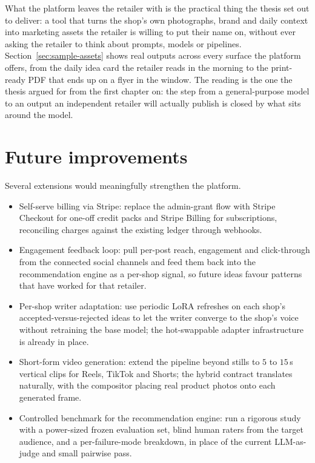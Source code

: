 What the platform leaves the retailer with is the practical thing the thesis set out to deliver: a tool that turns the shop's own photographs, brand and daily context into marketing assets the retailer is willing to put their name on, without ever asking the retailer to think about prompts, models or pipelines. Section~\ref{sec:sample-assets} shows real outputs across every surface the platform offers, from the daily idea card the retailer reads in the morning to the print-ready PDF that ends up on a flyer in the window. The reading is the one the thesis argued for from the first chapter on: the step from a general-purpose model to an output an independent retailer will actually publish is closed by what sits around the model.

\section{Future improvements}
\label{sec:future-work}

Several extensions would meaningfully strengthen the platform.

\begin{itemize}
    \item Self-serve billing via Stripe: replace the admin-grant flow with Stripe Checkout for one-off credit packs and Stripe Billing for subscriptions, reconciling charges against the existing ledger through webhooks.
    \item Engagement feedback loop: pull per-post reach, engagement and click-through from the connected social channels and feed them back into the recommendation engine as a per-shop signal, so future ideas favour patterns that have worked for that retailer.
    \item Per-shop writer adaptation: use periodic LoRA refreshes on each shop's accepted-versus-rejected ideas to let the writer converge to the shop's voice without retraining the base model; the hot-swappable adapter infrastructure is already in place.
    \item Short-form video generation: extend the pipeline beyond stills to $5$ to $15$\,s vertical clips for Reels, TikTok and Shorts; the hybrid contract translates naturally, with the compositor placing real product photos onto each generated frame.
    \item Controlled benchmark for the recommendation engine: run a rigorous study with a power-sized frozen evaluation set, blind human raters from the target audience, and a per-failure-mode breakdown, in place of the current LLM-as-judge and small pairwise pass.
\end{itemize}
